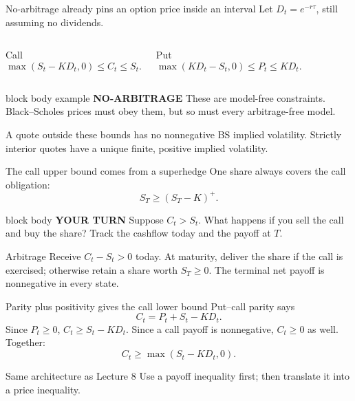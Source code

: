\documentclass[handout,10pt,aspectratio=169]{beamer}
\newenvironment{marketbox}{\begin{beamercolorbox}[rounded=true,sep=0.7em,wd=\textwidth]{block body example}
  \textbf{\color{CourseGreen}NO-ARBITRAGE}\quad}{\end{beamercolorbox}}
\newenvironment{pausebox}{\begin{beamercolorbox}[rounded=true,sep=0.8em,wd=\textwidth]{block body}
  \textbf{\color{CourseGold}YOUR TURN}\quad}{\end{beamercolorbox}}
\newcommand{\1}{\mathbf 1}
\begin{document}
\begin{frame}{No-arbitrage already pins an option price inside an interval}
Let \(D_t=e^{-r\tau}\), still assuming no dividends.
\begin{columns}[T,onlytextwidth]
\begin{block}{Call}
\[
\boxed{\max(S_t-KD_t,0)\le C_t\le S_t.}
\]
\end{block}
\begin{exampleblock}{Put}
\[
\boxed{\max(KD_t-S_t,0)\le P_t\le KD_t.}
\]
\end{exampleblock}
\end{columns}
\begin{marketbox}
These are model-free constraints. Black--Scholes prices must obey them, but
so must every arbitrage-free model.
\end{marketbox}
A quote outside these bounds has no nonnegative BS implied volatility.
Strictly interior quotes have a unique finite, positive implied volatility.
\end{frame}

\begin{frame}{The call upper bound comes from a superhedge}
One share always covers the call obligation:
\[
S_T\ge(S_T-K)^+.
\]
\begin{pausebox}
Suppose \(C_t>S_t\). What happens if you sell the call and buy the share?
Track the cashflow today and the payoff at \(T\).
\end{pausebox}

\begin{exampleblock}{Arbitrage}
Receive \(C_t-S_t>0\) today. At maturity, deliver the share if the call is
exercised; otherwise retain a share worth \(S_T\ge0\). The terminal net
payoff is nonnegative in every state.
\end{exampleblock}
\end{frame}

\begin{frame}{Parity plus positivity gives the call lower bound}
Put--call parity says
\[
C_t=P_t+S_t-KD_t.
\]
Since \(P_t\ge0\), \(C_t\ge S_t-KD_t\). Since a call payoff is nonnegative,
\(C_t\ge0\) as well. Together:
\[
\boxed{C_t\ge\max(S_t-KD_t,0).}
\]
\begin{block}{Same architecture as Lecture 8}
Use a payoff inequality first; then translate it into a price inequality.
\end{block}
\end{frame}
\end{document}
